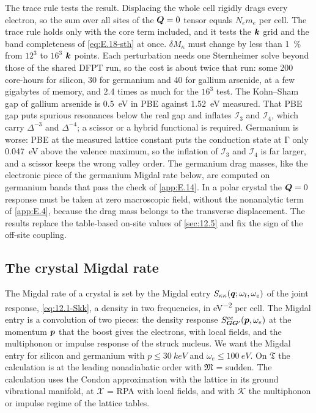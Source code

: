 The trace rule tests the result. Displacing the whole cell rigidly drags every electron, so the sum over all sites of the $\bm{Q} = 0$ tensor equals $N_e m_e$ per cell. The trace rule holds only with the core term included, and it tests the $\bm{k}$ grid and the band completeness of \cref{eq:E.18-sth} at once. $\delta M_\kappa$ must change by less than \SI{1}{\percent} from $12^3$ to $16^3$ $\bm{k}$ points. Each perturbation needs one Sternheimer solve beyond those of the shared DFPT run, so the cost is about twice that run: some 200 core-hours for silicon, 30 for germanium and 40 for gallium arsenide, at a few gigabytes of memory, and 2.4 times as much for the $16^3$ test. The Kohn--Sham gap of gallium arsenide is \SI{0.5}{eV} in PBE against \SI{1.52}{eV} measured. That PBE gap puts spurious resonances below the real gap and inflates $\mathcal{I}_3$ and $\mathcal{I}_4$, which carry $\Delta^{-3}$ and $\Delta^{-4}$; a scissor or a hybrid functional is required. Germanium is worse: PBE at the measured lattice constant puts the conduction state at $\mathrm{\Gamma}$ only \SI{0.047}{eV} above the valence maximum, so the inflation of $\mathcal{I}_3$ and $\mathcal{I}_4$ is far larger, and a scissor keeps the wrong valley order. The germanium drag masses, like the electronic piece of the germanium Migdal rate below, are computed on germanium bands that pass the check of \cref{app:E.14}. In a polar crystal the $\bm{Q} = 0$ response must be taken at zero macroscopic field, without the nonanalytic term of \cref{app:E.4}, because the drag mass belongs to the transverse displacement. The results replace the table-based on-site values of \cref{sec:12.5} and fix the sign of the off-site coupling.

\subsection{The crystal Migdal rate}

The Migdal rate of a crystal is set by the Migdal entry $S_{\kappa\kappa}(\bm{q};\omega_l,\omega_e)$ of the joint response, \cref{eq:12.1-Skk}, a density in two frequencies, in \si{eV^{-2}} per cell. The Migdal entry is a convolution of two pieces: the density response $S^{ee}_{\bm{G}\bm{G}'}(\bm{p},\omega_e)$ at the momentum $\bm{p}$ that the boost gives the electrons, with local fields, and the multiphonon or impulse response of the struck nucleus. We want the Migdal entry for silicon and germanium with $p \le \SI{30}{keV}$ and $\omega_e \le \SI{100}{eV}$. On $\mathfrak{T}$ the calculation is at the leading nonadiabatic order with $\mathfrak{M}$ = sudden. The calculation uses the Condon approximation with the lattice in its ground vibrational manifold, at $\mathcal{X}$ = RPA with local fields, and with $\mathcal{K}$ the multiphonon or impulse regime of the lattice tables.

